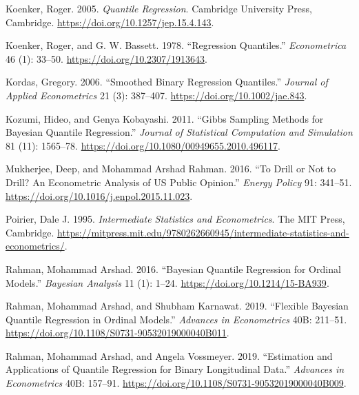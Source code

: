 \begin{CSLReferences}{1}{0}
\leavevmode{}%
Koenker, Roger. 2005. \emph{Quantile Regression}. Cambridge University Press, Cambridge. \url{https://doi.org/10.1257/jep.15.4.143}.

\leavevmode{}%
Koenker, Roger, and G. W. Bassett. 1978. {``Regression Quantiles.''} \emph{Econometrica} 46 (1): 33--50. \url{https://doi.org/10.2307/1913643}.

\leavevmode{}%
Kordas, Gregory. 2006. {``Smoothed Binary Regression Quantiles.''} \emph{Journal of Applied Econometrics} 21 (3): 387--407. \url{https://doi.org/10.1002/jae.843}.

\leavevmode{}%
Kozumi, Hideo, and Genya Kobayashi. 2011. {``Gibbs Sampling Methods for {Bayesian} Quantile Regression.''} \emph{Journal of Statistical Computation and Simulation} 81 (11): 1565--78. \url{https://doi.org/10.1080/00949655.2010.496117}.

\leavevmode{}%
Mukherjee, Deep, and Mohammad Arshad Rahman. 2016. {``To Drill or Not to Drill? An Econometric Analysis of {US} Public Opinion.''} \emph{Energy Policy} 91: 341--51. \url{https://doi.org/10.1016/j.enpol.2015.11.023}.

\leavevmode{}%
Poirier, Dale J. 1995. \emph{Intermediate Statistics and Econometrics}. The MIT Press, Cambridge. \url{https://mitpress.mit.edu/9780262660945/intermediate-statistics-and-econometrics/}.

\leavevmode{}%
Rahman, Mohammad Arshad. 2016. {``Bayesian Quantile Regression for Ordinal Models.''} \emph{Bayesian Analysis} 11 (1): 1--24. \url{https://doi.org/10.1214/15-BA939}.

\leavevmode{}%
Rahman, Mohammad Arshad, and Shubham Karnawat. 2019. {``Flexible {Bayesian} Quantile Regression in Ordinal Models.''} \emph{Advances in Econometrics} 40B: 211--51. \url{https://doi.org/10.1108/S0731-90532019000040B011}.

\leavevmode{}%
Rahman, Mohammad Arshad, and Angela Vossmeyer. 2019. {``Estimation and Applications of Quantile Regression for Binary Longitudinal Data.''} \emph{Advances in Econometrics} 40B: 157--91. \url{https://doi.org/10.1108/S0731-90532019000040B009}.


\end{CSLReferences}
